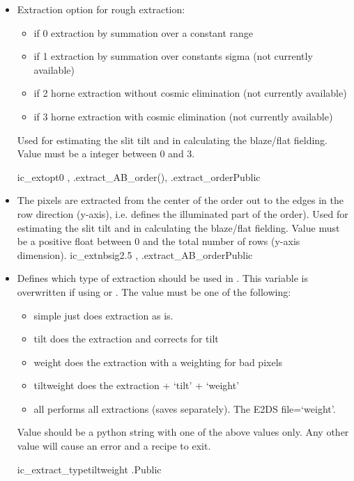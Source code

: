 \begin{itemize}

\item {}
{Extraction option for rough extraction:
\begin{itemize}
\item if 0 extraction by summation over a constant range
\item if 1 extraction by summation over constants sigma (not currently available)
\item if 2 horne extraction without cosmic elimination (not currently available)
\item if 3 horne extraction with cosmic elimination (not currently available)
\end{itemize}
 Used for estimating the slit tilt and in calculating the blaze/flat fielding. Value must be a integer between 0 and 3.
}
{ic\_extopt}{0}
{\calSLIT, \calFFraw}{\constantsfile}
{\spirouEXTOR.extract\_AB\_order(), \spirouEXTOR.extract\_order}{Public}

\item {}
{The pixels are extracted from the center of the order out to the edges in the row direction (y-axis), i.e. defines the illuminated part of the order). Used for estimating the slit tilt and in calculating the blaze/flat fielding. Value must be a positive float between 0 and the total number of rows (y-axis dimension).}
{ic\_extnbsig}{2.5}
{\calSLIT, \calFFraw}{\constantsfile}{\spirouEXTOR.extract\_AB\_order}{Public}


\item {} 
{Defines which type of extraction should be used in \calextractRAW. This variable is overwritten if using \calextractRAWAB or \calextractRAWC. The value must be one of the following:
\begin{itemize}
\item simple \dotfill just does extraction as is.
\item tilt \dotfill does the extraction and corrects for tilt
\item weight \dotfill does the extraction with a weighting for bad pixels
\item tiltweight \dotfill does the extraction + `tilt' + `weight'
\item all \dotfill performs all extractions (saves separately). The E2DS file=`weight'.
\end{itemize}
Value should be a python string with one of the above values only. Any other value will cause an error and a recipe to exit.
}
{ic\_extract\_type}{tiltweight}
{\calextractRAW}{\constantsfile}{\calextractRAW.\progMAIN}{Public}


\end{itemize}
